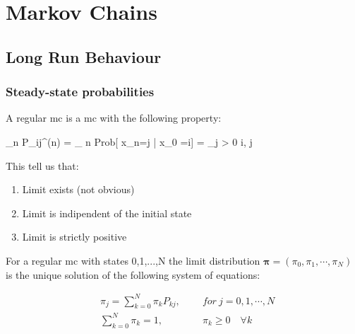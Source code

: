 \chapter{Markov Chains}

\section{Long Run Behaviour}

\subsection{Steady-state probabilities}

	\begin{definition}
		A regular \gls{mc} is a \gls{mc} with the following property:

		\beq \lim_{n \to \infty} P_{ij}^{(n)} = \lim_{ n \to \infty} Prob[ x_n=j | x_0 =i] = \pi_j > 0 \quad \forall i, j \eeq
	\end{definition}

	This tell us that:
	\begin{enumerate}
		\item Limit exists (not obvious)
		\item Limit is indipendent of the initial state
		\item Limit is strictly positive
	\end{enumerate}

	\begin{theorem}
		For a regular \gls{mc} with states 0,1,...,N the limit distribution $\bm\pi = (\pi_0,\pi_1,\cdots,\pi_N)$ is the unique solution of the following system of equations:

		\begin{align}
			&\pi_j = \sum_{k=0}^N \pi_k P_{k j} , \qquad ~for ~j = 0,1, \cdots, N \\
			&\sum_{k=0}^N \pi_k = 1, \qquad \qquad \pi_k \ge 0 \quad \forall k
		\end{align}

	\end{theorem}

